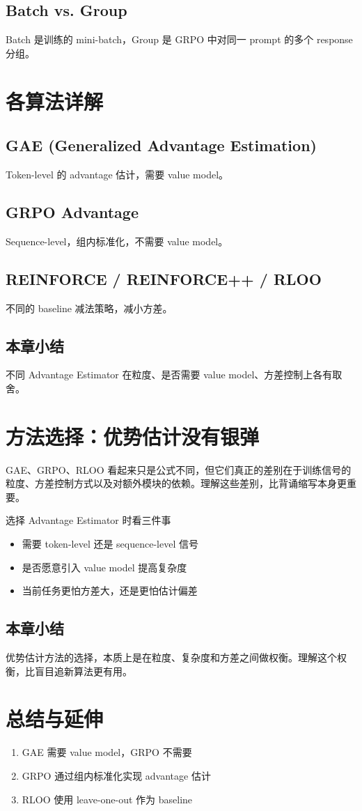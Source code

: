 \documentclass[a4paper]{article}
\begin{document}
\subsection{Batch vs. Group}
Batch 是训练的 mini-batch，Group 是 GRPO 中对同一 prompt 的多个 response 分组。

\section{各算法详解}
\subsection{GAE (Generalized Advantage Estimation)}
Token-level 的 advantage 估计，需要 value model。

\subsection{GRPO Advantage}
Sequence-level，组内标准化，不需要 value model。

\subsection{REINFORCE / REINFORCE++ / RLOO}
不同的 baseline 减法策略，减小方差。

\subsection{本章小结}
不同 Advantage Estimator 在粒度、是否需要 value model、方差控制上各有取舍。

\newpage
\section{方法选择：优势估计没有银弹}
GAE、GRPO、RLOO 看起来只是公式不同，但它们真正的差别在于训练信号的粒度、方差控制方式以及对额外模块的依赖。理解这些差别，比背诵缩写本身更重要。

\begin{knowledgebox}{选择 Advantage Estimator 时看三件事}
\begin{itemize}
  \item 需要 token-level 还是 sequence-level 信号
  \item 是否愿意引入 value model 提高复杂度
  \item 当前任务更怕方差大，还是更怕估计偏差
\end{itemize}
\end{knowledgebox}

\subsection{本章小结}
优势估计方法的选择，本质上是在粒度、复杂度和方差之间做权衡。理解这个权衡，比盲目追新算法更有用。

\newpage
\section{总结与延伸}
\begin{enumerate}
  \item GAE 需要 value model，GRPO 不需要
  \item GRPO 通过组内标准化实现 advantage 估计
  \item RLOO 使用 leave-one-out 作为 baseline
\end{enumerate}
\end{document}
